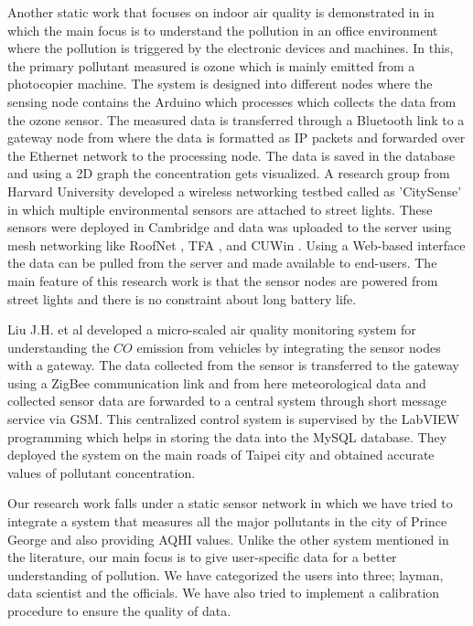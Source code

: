 Another static work that focuses on indoor air quality is demonstrated in \cite{Firdhous2017} in which the main focus is to understand the pollution in an office environment where the pollution is triggered by the electronic devices and machines. In this, the primary pollutant measured is ozone which is mainly emitted from a photocopier machine. The system is designed into different nodes where the sensing node contains the Arduino which processes which collects the data from the ozone sensor. The measured data is transferred through a Bluetooth link to a gateway node from where the data is formatted as IP packets and forwarded over the Ethernet network to the processing node. The data is saved in the database and using a 2D graph the concentration gets visualized. A research group from Harvard University developed a wireless networking testbed called as 'CitySense' \cite{Murty2008} in which multiple environmental sensors are attached to street lights. These sensors were deployed in Cambridge and data was uploaded to the server using mesh networking like RoofNet \cite{Bicket2005}, TFA \cite{Camp2006}, and CUWin \cite{cuwin2006}. Using a Web-based interface the data can be pulled from the server and made available to end-users. The main feature of this research work is that the sensor nodes are powered from street lights and there is no constraint about long battery life.
\par
Liu J.H. et al \cite{Liu2011} developed a micro-scaled air quality monitoring system for understanding the $CO$ emission from vehicles by integrating the sensor nodes with a gateway. The data collected from the sensor is transferred to the gateway using a ZigBee communication link and from here meteorological data and collected sensor data are forwarded to a central system through short message service via GSM. This centralized control system is supervised by the LabVIEW \cite{INSTRUMENTS2013} programming which helps in storing the data into the MySQL database. They deployed the system on the main roads of Taipei city and obtained accurate values of pollutant concentration.

Our research work falls under a static sensor network in which we have tried to integrate a system that measures all the major pollutants in the city of Prince George and also providing AQHI values. Unlike the other system mentioned in the literature, our main focus is to give  user-specific data for a better understanding of pollution. We have categorized the users into three; layman, data scientist and the officials. We have also tried to implement a calibration procedure to ensure the quality of data. 

